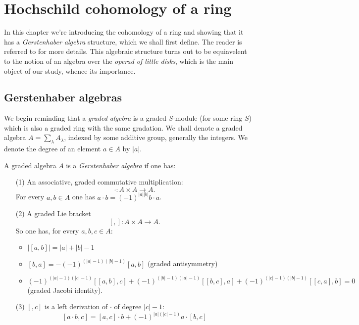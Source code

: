 \documentclass[TFM.tex]{subfiles}
\begin{document}
\chapter{Hochschild cohomology of a ring}

In this chapter we're introducing the cohomology of a ring and showing that it has a \emph{Gerstenhaber algebra} structure, which we shall first define. The reader is referred to \cite{Gerstenhaber} for more details. This algebraic structure turns out to be equiavelent to the notion of an algebra over the \emph{operad of little disks}, which is the main object of our study, whence its importance. 


\section{Gerstenhaber algebras}

We begin reminding that a \emph{graded algebra} is a graded $S$-module (for some ring $S$) which is also a graded ring with the same gradation. We shall denote a graded algebra $A=\sum_\lambda A_\lambda$, indexed by some additive group, generally the integers. We denote the degree of an element $a\in A$ by $|a|$. %


\begin{defi}\label{defi1}
A graded algebra $A$ is a \emph{Gerstenhaber algebra} if one has:
\begin{enumerate}
\item[(1)] An associative, graded commutative multiplication:
\[
\cdot: A\times A\to A.
\]
For every $a,b\in A$ one has $a\cdot b=(-1)^{|a||b|}b\cdot a$.

\item[(2)] A graded Lie bracket 
\[
[,]:A\times A\to A.
\]
So one has, for every $a,b,c\in A$:
\begin{itemize}
\item $|[a,b]|=|a|+|b|-1$
\item $[b,a]=-(-1)^{(|a|-1)(|b|-1)}[a,b]$ (graded antisymmetry)
\item $(-1)^{(|a|-1)(|c|-1)}[[a,b],c]+(-1)^{(|b|-1)(|a|-1)}[[b,c],a]+(-1)^{(|c|-1)(|b|-1)}[[c,a],b]=0$ (graded Jacobi identity). 
\end{itemize}
\item[(3)]  $[,c]$ is a left derivation of $\cdot$ of degree $|c|-1$: %
\[
[a\cdot b,c]=[a,c]\cdot b+(-1)^{|a|(|c|-1)}a\cdot [b,c]
\]
\end{enumerate}
\end{defi}
\end{document}
